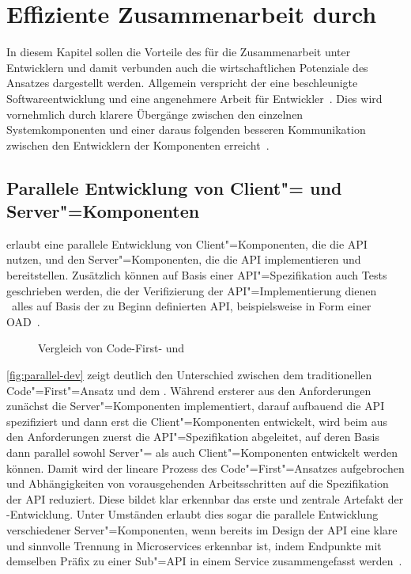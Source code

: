 \chapter{Effiziente Zusammenarbeit durch \AF}
In diesem Kapitel sollen die Vorteile des \AFAes für die Zusammenarbeit unter Entwicklern und damit verbunden auch die wirtschaftlichen Potenziale des Ansatzes dargestellt werden.
Allgemein verspricht der \AFA eine beschleunigte Softwareentwicklung und eine angenehmere Arbeit für Entwickler~\cite[354\psq]{de23}.
Dies wird vornehmlich durch klarere Übergänge zwischen den einzelnen Systemkomponenten und einer daraus folgenden besseren Kommunikation zwischen den Entwicklern der Komponenten erreicht~\cite[75]{bea22}.

\section{Parallele Entwicklung von Client"= und Server"=Komponenten} \label{sec:parallel-dev}
\AF erlaubt eine parallele Entwicklung von Client"=Komponenten, die die \ac{API} nutzen, und den Server"=Komponenten, die die \ac{API} implementieren und bereitstellen.
Zusätzlich können auf Basis einer \ac{API}"=Spezifikation auch Tests geschrieben werden, die der Verifizierung der \ac{API}"=Implementierung dienen \textendash\ alles auf Basis der zu Beginn definierten \ac{API}, beispielsweise in Form einer \ac{OAD}~\cite{vol22}.

\begin{figure}[hb]
	\centering
	\qquad
	\subfloat[\centering \AFA]{\label{fig:api-first}}
	\caption{Vergleich von Code-First- und \AFA}
	\label{fig:parallel-dev}
\end{figure}

\autoref{fig:parallel-dev} zeigt deutlich den Unterschied zwischen dem traditionellen Code"=First"=Ansatz und dem \AFA.
Während ersterer aus den Anforderungen zunächst die Server"=Komponenten implementiert, darauf aufbauend die \ac{API} spezifiziert und dann erst die Client"=Komponenten entwickelt, wird beim \AFA aus den Anforderungen zuerst die \ac{API}"=Spezifikation abgeleitet, auf deren Basis dann parallel sowohl Server"= als auch Client"=Komponenten entwickelt werden können.
Damit wird der lineare Prozess des Code"=First"=Ansatzes aufgebrochen und Abhängigkeiten von vorausgehenden Arbeitsschritten auf die Spezifikation der \ac{API} reduziert.
Diese bildet klar erkennbar das erste und zentrale Artefakt der \AF-Entwicklung.
Unter Umständen erlaubt dies sogar die parallele Entwicklung verschiedener Server"=Komponenten, wenn bereits im Design der \ac{API} eine klare und sinnvolle Trennung in Microservices erkennbar ist, indem \bspw Endpunkte mit demselben Präfix zu einer Sub"=\ac{API} in einem Service zusammengefasst werden~\cite[354]{de23}.

